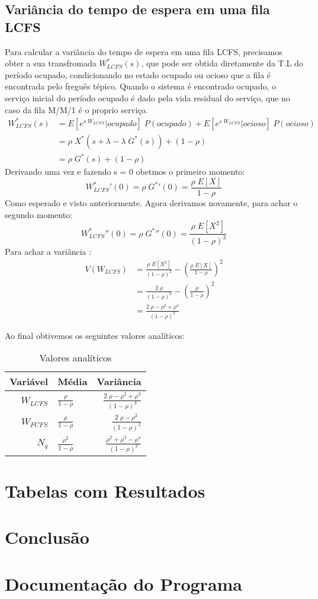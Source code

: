 \documentclass[a4paper]{article}
\newcommand{\E}[1]{E\!\left[#1\right]}
\begin{document}
\subsection{Variância do tempo de espera em uma fila LCFS}
Para calcular a variância do tempo de espera em uma fila LCFS, precisamos obter
a sua transfromada \(W_{LCFS}^*(s)\), que pode ser obtida diretamente da T.L
do período ocupado, condicionando no estado ocupado ou ocioso que a fila  é encontrada pelo freguês tépico.
Quando o sistema é encontrado ocupado, o serviço inicial do período ocupado  é dado pela vida residual do
serviço, que no caso da fila M/M/1 é o proprio serviço.
\begin{align*}
    W_{LCFS}^*(s) &= \E{e^{s\;W_{LCFS}}|ocupado} \; P(ocupado) + \E{e^{s\;W_{LCFS}}|ocioso} \; P(ocioso)\\
    &= \rho\;  X^*(s+\lambda- \lambda\;G^*(s)) + (1-\rho)\\
    &=  \rho\; G^*(s) + (1-\rho)
\end{align*}
Derivando uma vez e fazendo s = 0 obetmos o primeiro momento:
\[
{W_{LCFS}^*}'(0) =  \rho\; {G^*}'(0) = \frac{ \rho\;\E{X}}{ 1-\rho}
\]
Como esperado e visto anteriormente. Agora derivamos novamente, para achar o segundo momento:
\[
{W_{LCFS}^*}''(0) =  \rho\; {G^*}''(0) = \frac{ \rho\;\E{X^2}}{(1-\rho)^3}
\]
Para achar a variância :
\begin{align*}
V(W_{LCFS})&= \frac{ \rho\;\E{X^2}}{(1-\rho)^3} - (\frac{ \rho\;\E{X}}{ 1-\rho})^2\\
&= \frac{ 2\; \rho}{(1-\rho)^3} - (\frac{ \rho}{ 1-\rho})^2\\
&=\frac{ 2\; \rho -\rho^2 + \rho^3}{(1-\rho)^3}
\end{align*}

Ao final obtivemos os seguintes valores analíticos:

\begin{table}[h]
\centering
\caption{Valores analíticos}
\vspace{0.9cm}
\begin{tabular}{r|lr}

Variável & Média & Variância \\ %
\hline                               %
\(W_{LCFS}\) & \(\frac{ \rho}{ 1-\rho}\)  & \(\frac{ 2\; \rho -\rho^2 + \rho^3}{(1-\rho)^3}\) \\
\(W_{FCFS}\) & \(\frac{ \rho}{ 1-\rho}\)  & \(\frac{2 \; \rho -\rho^2 }{(1 - \rho)^2}\) \\
\(N_q\)      & \(\frac{ \rho^2}{ 1-\rho}\)& \(\frac{\rho^2 + \rho^3 - \rho^4}{(1 - \rho)^2}\) \\

\end{tabular}
\end{table}
\newpage
\section{Tabelas com Resultados}
\section{Conclusão}
\section{Documentação do Programa}
\end{document}
